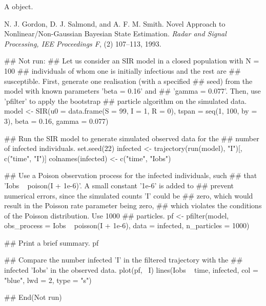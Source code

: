 \documentclass[letterpaper]{book}
\begin{document}
%
\begin{Value}
A  object.
\end{Value}
%
\begin{References}
N. J. Gordon, D. J. Salmond, and A. F. M. Smith. Novel Approach to Nonlinear/Non-Gaussian Bayesian State Estimation. \emph{Radar and Signal Processing, IEE Proceedings F}, (2) 107--113, 1993. 
\end{References}
%
\begin{Examples}
\begin{ExampleCode}
## Not run: 
## Let us consider an SIR model in a closed population with N = 100
## individuals of whom one is initially infectious and the rest are
## susceptible. First, generate one realisation (with a specified
## seed) from the model with known parameters 'beta = 0.16' and
## 'gamma = 0.077'. Then, use 'pfilter' to apply the bootstrap
## particle algorithm on the simulated data.
model <- SIR(u0 = data.frame(S = 99, I = 1, R = 0),
             tspan = seq(1, 100, by = 3),
             beta = 0.16,
             gamma = 0.077)

## Run the SIR model to generate simulated observed data for the
## number of infected individuals.
set.seed(22)
infected <- trajectory(run(model), "I")[, c("time", "I")]
colnames(infected) <- c("time", "Iobs")

## Use a Poison observation process for the infected individuals, such
## that 'Iobs ~ poison(I + 1e-6)'. A small constant '1e-6' is added to
## prevent numerical errors, since the simulated counts 'I' could be
## zero, which would result in the Poisson rate parameter being zero,
## which violates the conditions of the Poisson distribution. Use 1000
## particles.
pf <- pfilter(model,
              obs_process = Iobs ~ poisson(I + 1e-6),
              data = infected,
              n_particles = 1000)

## Print a brief summary.
pf

## Compare the number infected 'I' in the filtered trajectory with the
## infected 'Iobs' in the observed data.
plot(pf, ~I)
lines(Iobs ~ time, infected, col = "blue", lwd = 2, type = "s")

## End(Not run)
\end{ExampleCode}
\end{Examples}
\end{document}
